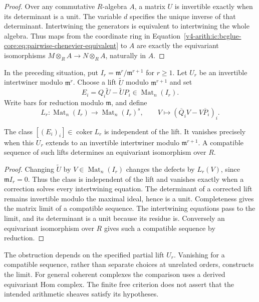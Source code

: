 \begin{proof}
Over any commutative $R$-algebra $A$, a matrix $U$ is invertible
exactly when its determinant is a unit. The variable $d$ specifies
the unique inverse of that determinant. Intertwining the generators
is equivalent to intertwining the whole algebra. Thus maps from
the coordinate ring in
Equation~\eqref{v4-arith:ic:bcglue-core:eq:pairwise-chenevier-equivalent}
to $A$ are exactly the equivariant
isomorphisms $M\otimes_R A\to N\otimes_R A$, naturally in $A$.
\end{proof}

\begin{proposition}
\label{v4-arith:ic:bcglue-core:cor:part-a-domain-reduction}
In the preceding situation, put
$I_r=\mathfrak m^r/\mathfrak m^{r+1}$ for $r\ge1$.
Let $U_r$ be an invertible intertwiner modulo $\mathfrak m^r$.
Choose a lift $\widetilde U$ modulo $\mathfrak m^{r+1}$ and set
\[
 E_i=Q_i\widetilde U-\widetilde U P_i
       \in\operatorname{Mat}_n(I_r).
\]
Write bars for reduction modulo $\mathfrak m$, and define
\[
 L_r:\operatorname{Mat}_n(I_r)\longrightarrow
       \operatorname{Mat}_n(I_r)^s,
 \qquad V\longmapsto(\overline Q_iV-V\overline P_i)_i.
\]

The class $[(E_i)_i]\in\operatorname{coker}L_r$ is independent
of the lift. It vanishes precisely when this $U_r$ extends to
an invertible intertwiner modulo $\mathfrak m^{r+1}$.
A compatible sequence of such lifts determines an equivariant
isomorphism over $R$.
\end{proposition}

\begin{proof}
Changing $\widetilde U$ by $V\in\operatorname{Mat}_n(I_r)$
changes the defects by $L_r(V)$, since $\mathfrak m I_r=0$.
Thus the class is independent of the lift and vanishes exactly
when a correction solves every intertwining equation.
The determinant of a corrected lift remains invertible modulo the
maximal ideal, hence is a unit. Completeness gives the matrix limit
of a compatible sequence. The intertwining equations pass to the
limit, and its determinant is a unit because its residue is.
Conversely an equivariant isomorphism over $R$ gives such a
compatible sequence by reduction.
\end{proof}

The obstruction depends on the specified partial lift $U_r$.
Vanishing for a compatible sequence, rather than separate choices
at unrelated orders, constructs the limit.
For general coherent complexes the comparison uses a derived
equivariant Hom complex. The finite free criterion does not assert
that the intended arithmetic sheaves satisfy its hypotheses.

